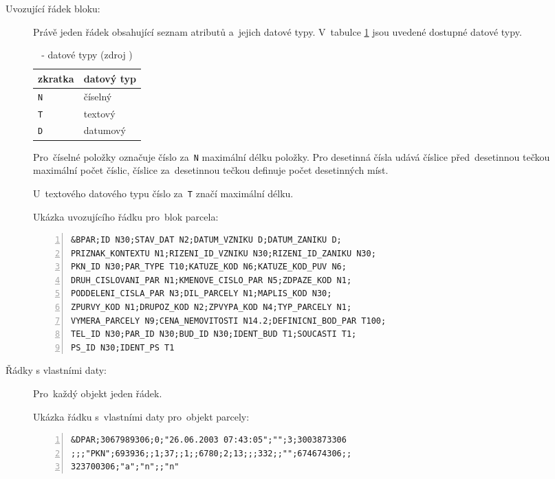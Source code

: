 \begin{description}	
	\item[Uvozující řádek bloku:] Právě jeden řádek obsahující seznam atributů a~jejich datové typy. V~tabulce \ref{tab:datove_typy} jsou uvedené dostupné datové typy.

\begin{table}[H]
    \begin{tabular}{|l|l|}
        \hline
         zkratka & datový typ \\
        \hline
        \hline
         \texttt{N} & číselný \\ \hline
         \texttt{T} & textový \\ \hline
         \texttt{D} & datumový \\
         \hline
    \end{tabular}
    \centering
    \caption[ - datové typy]{ - datové typy (zdroj \citep{struktura_vfk})}
    \label{tab:datove_typy}
\end{table}

Pro~číselné položky označuje číslo za~\texttt{N} maximální délku položky. Pro desetinná čísla udává číslice před~desetinnou tečkou maximální počet číslic, číslice za~desetinnou tečkou definuje počet desetinných míst.

U~textového datového typu číslo za~\texttt{T} značí maximální délku.

Ukázka uvozujícího řádku pro~blok parcela:

	\begin{lstlisting}[basicstyle=\footnotesize\ttfamily, backgroundcolor = \color{light-gray},  numbers=left]
&BPAR;ID N30;STAV_DAT N2;DATUM_VZNIKU D;DATUM_ZANIKU D;
PRIZNAK_KONTEXTU N1;RIZENI_ID_VZNIKU N30;RIZENI_ID_ZANIKU N30;
PKN_ID N30;PAR_TYPE T10;KATUZE_KOD N6;KATUZE_KOD_PUV N6;
DRUH_CISLOVANI_PAR N1;KMENOVE_CISLO_PAR N5;ZDPAZE_KOD N1;
PODDELENI_CISLA_PAR N3;DIL_PARCELY N1;MAPLIS_KOD N30;
ZPURVY_KOD N1;DRUPOZ_KOD N2;ZPVYPA_KOD N4;TYP_PARCELY N1;
VYMERA_PARCELY N9;CENA_NEMOVITOSTI N14.2;DEFINICNI_BOD_PAR T100;
TEL_ID N30;PAR_ID N30;BUD_ID N30;IDENT_BUD T1;SOUCASTI T1;
PS_ID N30;IDENT_PS T1
	\end{lstlisting}

	\item[Řádky s vlastními daty:] Pro~každý objekt jeden řádek.

Ukázka řádku s~vlastními daty pro~objekt parcely:
	
	\begin{lstlisting}[basicstyle=\footnotesize\ttfamily, backgroundcolor = \color{light-gray},  numbers=left]
&DPAR;3067989306;0;"26.06.2003 07:43:05";"";3;3003873306
;;;"PKN";693936;;1;37;;1;;6780;2;13;;;332;;"";674674306;;
323700306;"a";"n";;"n"
	\end{lstlisting}
\end{description}

